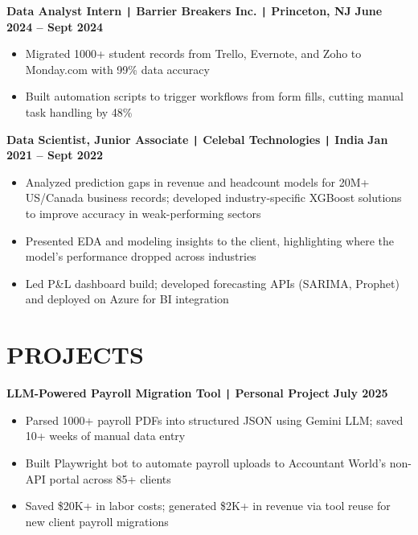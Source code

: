 \documentclass[10pt]{article}
\begin{document}
\vspace{-0.2cm}
\noindent
\textbf{Data Analyst Intern \texttt{|} Barrier Breakers Inc. \texttt{|} Princeton, NJ} \hfill \textbf{June 2024 -- Sept 2024} 
\vspace{-0.15cm}
\begin{itemize}[leftmargin=0.5cm, itemsep=0pt]

    \item Migrated 1000+ student records from Trello, Evernote, and Zoho to Monday.com with 99\% data accuracy

    \item Built automation scripts to trigger workflows from form fills, cutting manual task handling by 48\%

\end{itemize}

\vspace{-0.2cm}
\noindent
\textbf{Data Scientist, Junior Associate \texttt{|} Celebal Technologies \texttt{|} India} \hfill \textbf{Jan 2021 -- Sept 2022} 
\vspace{-0.15cm}
\begin{itemize}[leftmargin=0.5cm, itemsep=0pt]

    \item Analyzed prediction gaps in revenue and headcount models for 20M+ US/Canada business records; developed industry-specific XGBoost solutions to improve accuracy in weak-performing sectors

    \item Presented EDA and modeling insights to the client, highlighting where the model's performance dropped across industries

    \item Led P\&L dashboard build; developed forecasting APIs (SARIMA, Prophet) and deployed on Azure for BI integration

\end{itemize}


\vspace{-0.75cm}
\section*{PROJECTS}
\vspace{-0.1cm}

\noindent
\textbf{LLM-Powered Payroll Migration Tool \texttt{|} Personal Project} \hfill \textbf{July 2025} \\
\vspace{-0.4cm}
\begin{itemize}[leftmargin=0.6cm, itemsep=-0.1cm, topsep=0cm]

    \item Parsed 1000+ payroll PDFs into structured JSON using Gemini LLM; saved 10+ weeks of manual data entry

    \item Built Playwright bot to automate payroll uploads to Accountant World's non-API portal across 85+ clients

    \item Saved \$20K+ in labor costs; generated \$2K+ in revenue via tool reuse for new client payroll migrations

\end{itemize}
\end{document}
